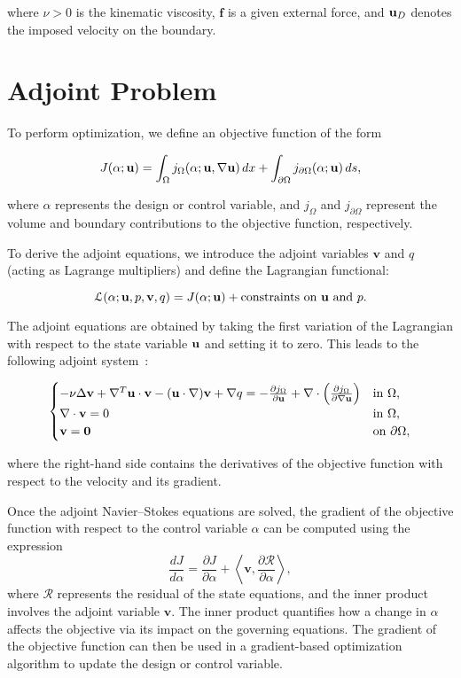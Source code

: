 where $\nu > 0$ is the kinematic viscosity, $\mathbf{f}$ is a given external force, and $\b_u_D$ denotes the imposed velocity on the boundary.

\section{Adjoint Problem}

To perform optimization, we define an objective function of the form

\begin{equation}
J(\alpha; \b_u) = \int_{\Omega} j_{\Omega}(\alpha; \b_u, \nabla \b_u)\, dx + \int_{\partial\Omega} j_{\partial\Omega}(\alpha; \b_u)\, ds,
\end{equation}

where $\alpha$ represents the design or control variable, and $j_{\Omega}$ and $j_{\partial\Omega}$ represent the volume and boundary contributions to the objective function, respectively.

To derive the adjoint equations, we introduce the adjoint variables $\mathbf{v}$ and $q$ (acting as Lagrange multipliers) and define the Lagrangian functional:

\[
\mathcal{L}(\alpha; \b_u, p, \mathbf{v}, q) = J(\alpha; \b_u) + \text{constraints on } \b_u \text{ and } p.
\]

The adjoint equations are obtained by taking the first variation of the Lagrangian with respect to the state variable $\b_u$ and setting it to zero. This leads to the following adjoint system~\cite{galecki2022adjoint}:

\begin{equation}
\begin{cases}
- \nu \Delta \mathbf{v} + \nabla^T \b_u \cdot \mathbf{v} - (\b_u \cdot \nabla) \mathbf{v} + \nabla q = - \frac{\partial j_{\Omega}}{\partial \b_u} + \nabla \cdot \left( \frac{\partial j_{\Omega}}{\partial \nabla \b_u} \right) & \text{in } \Omega, \\
\nabla \cdot \mathbf{v} = 0 & \text{in } \Omega, \\
\mathbf{v} = \mathbf{0} & \text{on } \partial \Omega,
\end{cases}
\label{adjoint}
\end{equation}

where the right-hand side contains the derivatives of the objective function with respect to the velocity and its gradient.

Once the adjoint Navier–Stokes equations are solved, the gradient of the objective function with respect to the control variable $\alpha$ can be computed using the expression
\[
\frac{dJ}{d\alpha} = \frac{\partial J}{\partial \alpha} + \left\langle \mathbf{v}, \frac{\partial \mathcal{R}}{\partial \alpha} \right\rangle,
\]
where $\mathcal{R}$ represents the residual of the state equations, and the inner product involves the adjoint variable $\mathbf{v}$. The inner product quantifies how a change in 
$\alpha$ affects the objective via its impact on the governing equations. The gradient of the objective function can then be used in a gradient-based optimization algorithm to update the design or control variable.


